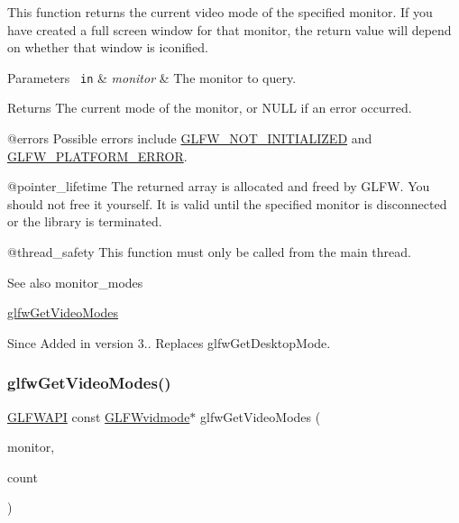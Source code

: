 This function returns the current video mode of the specified monitor. If you have created a full screen window for that monitor, the return value will depend on whether that window is iconified.


\begin{DoxyParams}[1]{Parameters}
\mbox{\texttt{ in}}  & {\em monitor} & The monitor to query. \\
\hline
\end{DoxyParams}
\begin{DoxyReturn}{Returns}
The current mode of the monitor, or {\ttfamily N\+U\+LL} if an error occurred.
\end{DoxyReturn}
@errors Possible errors include \mbox{\hyperlink{group__errors_ga2374ee02c177f12e1fa76ff3ed15e14a}{G\+L\+F\+W\+\_\+\+N\+O\+T\+\_\+\+I\+N\+I\+T\+I\+A\+L\+I\+Z\+ED}} and \mbox{\hyperlink{group__errors_gad44162d78100ea5e87cdd38426b8c7a1}{G\+L\+F\+W\+\_\+\+P\+L\+A\+T\+F\+O\+R\+M\+\_\+\+E\+R\+R\+OR}}.

@pointer\+\_\+lifetime The returned array is allocated and freed by G\+L\+FW. You should not free it yourself. It is valid until the specified monitor is disconnected or the library is terminated.

@thread\+\_\+safety This function must only be called from the main thread.

\begin{DoxySeeAlso}{See also}
monitor\+\_\+modes 

\mbox{\hyperlink{group__monitor_ga811c28d61595e630774389985947c665}{glfw\+Get\+Video\+Modes}}
\end{DoxySeeAlso}
\begin{DoxySince}{Since}
Added in version 3.. Replaces {\ttfamily glfw\+Get\+Desktop\+Mode}. 
\end{DoxySince}
\mbox{\label{group__monitor_ga811c28d61595e630774389985947c665}} 
\subsubsection{\texorpdfstring{glfwGetVideoModes()}{glfwGetVideoModes()}}
{\footnotesize\ttfamily \mbox{\hyperlink{glfw3_8h_a56da5036b2cc259351ae22fd6439bb47}{G\+L\+F\+W\+A\+PI}} const \mbox{\hyperlink{struct_g_l_f_wvidmode}{G\+L\+F\+Wvidmode}}$\ast$ glfw\+Get\+Video\+Modes (\begin{DoxyParamCaption}\item[{\mbox{\hyperlink{group__monitor_ga8d9efd1cde9426692c73fe40437d0ae3}{G\+L\+F\+Wmonitor}} $\ast$}]{monitor,  }\item[{int $\ast$}]{count }\end{DoxyParamCaption})}



